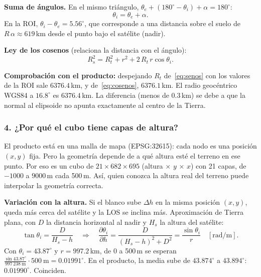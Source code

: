 \documentclass[11pt,a4paper]{article}
\newcommand{\por}{\ensuremath{\times}}
\begin{document}
\textbf{Suma de ángulos.} En el mismo triángulo, $\theta_e + (180^\circ - \theta_i) + \alpha = 180^\circ$:
\begin{equation}
  \theta_i = \theta_e + \alpha .
\end{equation}
En la ROI, $\theta_i - \theta_e = 5.56^\circ$, que corresponde a una distancia sobre el suelo de $R\,\alpha \approx 619$\,km desde el
punto bajo el satélite (nadir).

\textbf{Ley de los cosenos} (relaciona la distancia con el ángulo):
\begin{equation}
  R_s^2 = R_t^2 + r^2 + 2\,R_t\, r\cos\theta_i .
  \label{eq:cosenos}
\end{equation}

\textbf{Comprobación con el producto:} despejando $R_t$ de~\eqref{eq:senos} con los valores de la ROI sale $6376.4$\,km, y
de~\eqref{eq:cosenos}, $6376.1$\,km. El radio geocéntrico WGS84 a $16.8^\circ$ es $6376.4$\,km. La diferencia (menos de 0.3\,km) se
debe a que la normal al elipsoide no apunta exactamente al centro de la Tierra.

\subsubsection*{4. ¿Por qué el cubo tiene capas de altura?}

El producto está en una malla de mapa (EPSG:32615): cada nodo es una posición $(x, y)$ fija. Pero la geometría depende de a qué
altura esté el terreno en ese punto. Por eso  es un cubo de $21 \times 682 \times 695$ (altura \por{} $y$ \por{} $x$)
con 21 capas, de $-1000$ a $9000$\,m cada 500\,m. Así, quien conozca la altura real del terreno puede interpolar la geometría
correcta.

\textbf{Variación con la altura.} Si el blanco sube $\Delta h$ en la misma posición $(x,y)$, queda más cerca del satélite y la LOS se
inclina más. Aproximación de Tierra plana, con $D$ la distancia horizontal al nadir y $H_s$ la altura del satélite:
\begin{equation}
  \tan\theta_i = \frac{D}{H_s - h}
  \quad\Longrightarrow\quad
  \frac{\partial\theta_i}{\partial h} = \frac{D}{(H_s-h)^2 + D^2} = \frac{\sin\theta_i}{r}\quad[\text{rad/m}].
\end{equation}
Con $\theta_i = 43.87^\circ$ y $r = 997.2$\,km, de 0 a 500\,m se esperan
$\frac{\sin 43.87^\circ}{997\,238\ \text{m}}\cdot 500\ \text{m} = 0.01991^\circ$. En el producto, la media sube de $43.874^\circ$ a
$43.894^\circ$: $0.01990^\circ$. Coinciden.
\end{document}
